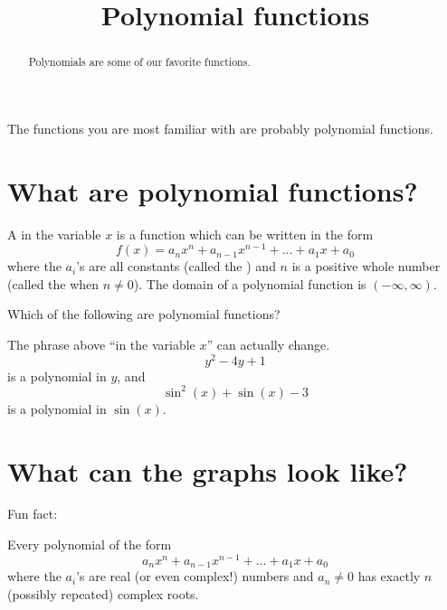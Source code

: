 \documentclass{ximera}
\title[Dig-In:]{Polynomial functions}
\begin{document}
\begin{abstract}
  Polynomials are some of our favorite functions. 
\end{abstract}
\maketitle


The functions you are most familiar with are probably polynomial
functions.

\section{What are polynomial functions?}

\begin{definition}
  A  in the variable $x$ is a function
  which can be written in the form
  \[
  f(x) = a_nx^n + a_{n-1}x^{n-1} + \dots + a_1 x + a_0
  \]
  where the $a_i$'s are all constants (called the )
  and $n$ is a positive whole number (called the  when $n\ne
  0$). The domain of a polynomial function is $(-\infty,\infty)$.
\end{definition}

\begin{question}
  Which of the following are polynomial functions?
  \begin{selectAll}
  \end{selectAll}
\end{question}

The phrase above ``in the variable $x$'' can actually change.
\[
y^2-4y +1
\]
is a polynomial in $y$, and
\[
\sin^2(x) + \sin(x) -3 
\]
is a polynomial in $\sin(x)$.


\section{What can the graphs look like?}

Fun fact:

\begin{theorem}
  Every polynomial of the form
  \[
  a_n x^n + a_{n-1} x^{n-1} + \dots + a_1 x + a_0
  \]
  where the $a_i$'s are real (or even complex!) numbers and $a_n \ne 0$ has exactly
  $n$ (possibly repeated) complex roots.
\end{theorem}
\end{document}
